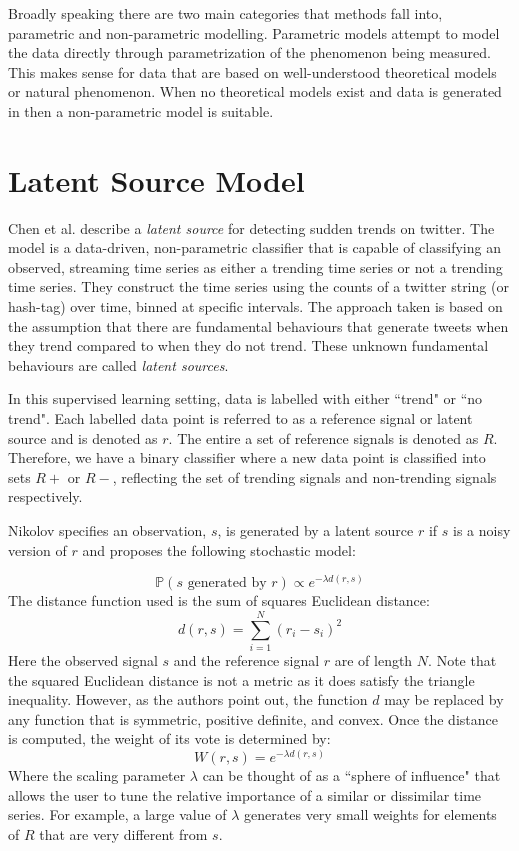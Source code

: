 Broadly speaking there are two main categories that methods fall into, parametric and non-parametric modelling. Parametric models attempt to model the data directly through parametrization of the phenomenon being measured. This makes sense for data that are based on well-understood theoretical models or natural phenomenon. When no theoretical models exist and data is generated in then a non-parametric model is suitable.

\section{Latent Source Model}

Chen et al.  \cite{NIPS2013_5116} describe a \textit{latent source} for detecting sudden trends on twitter. The model is a data-driven, non-parametric classifier that is capable of classifying an observed, streaming time series as either a trending time series or not a trending time series. They construct the time series using the counts of a twitter string (or hash-tag) over time, binned at specific intervals. The approach taken is based on the assumption that there are fundamental behaviours that generate tweets when they trend compared to when they do not trend. These unknown fundamental behaviours are called \textit{latent sources}.  

In this supervised learning setting, data is labelled with either ``trend" or ``no trend". Each labelled data point is referred to as a reference signal or latent source and is denoted as $r$. The entire a set of reference signals is denoted as $R$. Therefore, we have a binary classifier where a new data point is classified into sets $R+$ or $R-$, reflecting the set of trending signals and non-trending signals respectively. 

Nikolov  \cite{nikolov2012trend} specifies an observation, $s$, is generated by a latent source
$r$ if $s$ is a noisy version of $r$ and proposes the following stochastic model:

\begin{equation}
\mathbb{P}(s \text{ generated by }  r) \propto e^{-\lambda d(r,s)} 
\end{equation}
The distance function used is the sum of squares Euclidean distance:
\begin{equation}
d(r,s) = \sum_{i=1}^N (r_i - s_i)^2 
\end{equation}
Here the observed signal $s$ and the reference signal $r$ are of length $N$. Note that the squared Euclidean distance is not a metric as it does satisfy the triangle inequality. However, as the authors point out,  the function $d$ may be replaced by any function that is symmetric, positive definite, and convex. 
Once the distance is computed, the weight of its vote is determined by: 
\begin{equation}
W(r,s) = e^{-\lambda d(r,s)}
\end{equation}
Where the scaling parameter $\lambda$ can be thought of as a ``sphere of influence" that allows the user to tune the relative importance of a similar or dissimilar time series. For example, a large value of $\lambda$ generates very small weights for elements of $R$ that are very different from $s$.

